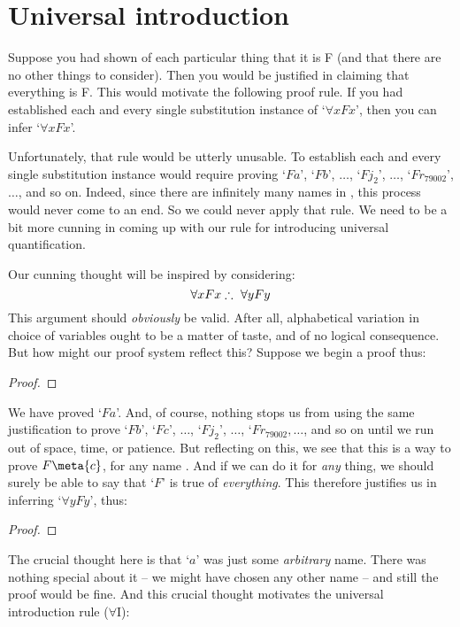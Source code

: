\section{Universal introduction}\label{uniint}
Suppose you had shown of each particular thing that it is F (and that there are no other things to consider). Then you would be justified in claiming that everything is F. This would motivate the following proof rule. If you had established each and every single substitution instance of `$\forall x Fx$', then you can infer `$\forall x Fx$'. 

Unfortunately, that rule would be utterly unusable. To establish each and every single substitution instance would require proving `$Fa$', `$Fb$', $…$, `$Fj_2$', $…$, `$Fr_{79002}$', $…$, and so on. Indeed, since there are infinitely many names in \FOL, this process would never come to an end. So we could never apply that rule. We need to be a bit more cunning in coming up with our rule for introducing universal quantification. 

Our cunning thought will be inspired by considering:
$$\forall x Fx \mathrel{\therefore}\ \forall y Fy$$
This argument should \emph{obviously} be valid. After all, alphabetical variation in choice of variables ought to be a matter of taste, and of no logical consequence. But how might our proof system reflect this? Suppose we begin a proof thus:
\begin{proof}
	 
\end{proof}
We have proved `$Fa$'. And, of course, nothing stops us from using the same justification to prove `$Fb$', `$Fc$', $…$, `$Fj_2$', $…$, `$Fr_{79002}, …$, and so on until we run out of space, time, or patience. But reflecting on this, we see that this is a way to prove $F\meta{c}$, for any name . And if we can do it for \emph{any} thing, we should surely be able to say that `$F$' is true of \emph{everything}. This therefore justifies us in inferring `$\forall y Fy$', thus:
\begin{proof}
	 
	 
\end{proof}
The crucial thought here is that `$a$' was just some \emph{arbitrary} name. There was nothing special about it – we might have chosen any other name – and still the proof would be fine. And this crucial thought motivates the universal introduction rule ($\forall$I):

